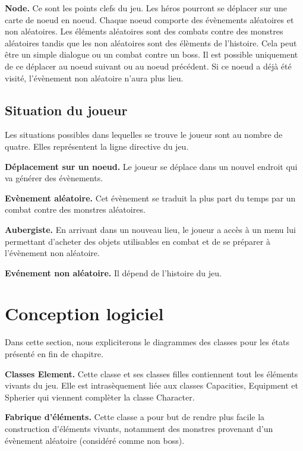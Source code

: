 \documentclass[12pt,a4paper]{report}
\begin{document}
\textbf{Node.} Ce sont les points clefs du jeu. Les h\'{e}ros pourront se d\'{e}placer sur une carte de noeud en noeud. Chaque noeud comporte des \'{e}v\`{e}nements al\'{e}atoires et non al\'{e}atoires. Les \'{e}l\'{e}ments al\'{e}atoires sont des combats contre des monstres al\'{e}atoires tandis que les non al\'{e}atoires sont des \'{e}l\`{e}ments de l'histoire. Cela peut \^{e}tre un simple dialogue ou un combat contre un boss. Il est possible uniquement de ce d\'{e}placer au noeud suivant ou au noeud pr\'{e}c\'{e}dent. Si ce noeud a d\'{e}j\`{a} \'{e}t\'{e} visit\'{e}, l'\'{e}v\`{e}nement non al\'{e}atoire n'aura plus lieu.

\subsection{Situation du joueur}

Les situations possibles dans lequelles se trouve le joueur sont au nombre de quatre. Elles repr\'{e}sentent la ligne directive du jeu.

\textbf{D\'{e}placement sur un noeud.} Le joueur se d\'{e}place dans un nouvel endroit qui va g\'{e}n\'{e}rer des \'{e}v\`{e}nements. 

\textbf{Ev\`{e}nement al\'{e}atoire.} Cet \'{e}v\`{e}nement se traduit la plus part du temps par un combat contre des monstres al\'{e}atoires.

\textbf{Aubergiste.} En arrivant dans un nouveau lieu, le joueur a acc\`{e}s \`{a} un menu lui permettant d'acheter des objets utilisables en combat et de se pr\'{e}parer \`{a} l'\'{e}v\`{e}nement non al\'{e}atoire.

\textbf{Ev\'{e}nement non al\'{e}atoire.} Il d\'{e}pend de l'histoire du jeu.

\section{Conception logiciel}

Dans cette section, nous expliciterons le diagrammes des classes pour les \'{e}tats pr\'{e}sent\'{e} en fin de chapitre. 

\textbf{Classes Element.} Cette classe et ses classes filles contiennent tout les \'{e}l\'{e}ments vivants du jeu. Elle est intras\`{e}quement li\'{e}e aux classes Capacities, Equipment et Spherier qui viennent compl\`{e}ter la classe Character. 

\textbf{Fabrique d'\'{e}l\'{e}ments.} Cette classe a pour but de rendre plus facile la construction d'\'{e}l\'{e}ments vivants, notamment des monstres provenant d'un \'{e}v\`{e}nement al\'{e}atoire (consid\'{e}r\'{e} comme non boss).
\end{document}
